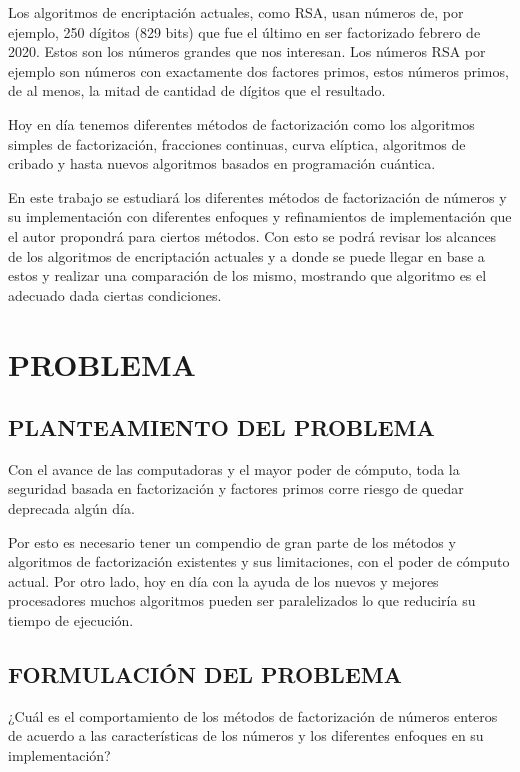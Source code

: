 \documentclass[12pt,letterpaper]{book}
\begin{document}
    Los algoritmos de encriptación actuales, como RSA, usan números de, por ejemplo, 250 dígitos (829 bits) que fue el último en ser factorizado febrero de 2020. Estos son los números grandes que nos interesan. Los números RSA por ejemplo son números con exactamente dos factores primos, estos números primos, de al menos, la mitad de cantidad de dígitos que el resultado.

    Hoy en día tenemos diferentes métodos de factorización como los algoritmos simples de factorización, fracciones continuas, curva elíptica, algoritmos de cribado y hasta nuevos algoritmos basados en programación cuántica.

    En este trabajo se estudiará los diferentes métodos de factorización de números y su implementación con diferentes enfoques y refinamientos de implementación que el autor propondrá para ciertos métodos. Con esto se podrá revisar los alcances de los algoritmos de encriptación actuales y a donde se puede llegar en base a estos y realizar una comparación de los mismo, mostrando que algoritmo es el adecuado dada ciertas condiciones.
    \newpage
    \chapter{PROBLEMA}
    
    \section{PLANTEAMIENTO DEL PROBLEMA}
    Con el avance de las computadoras y el mayor poder de cómputo, toda la seguridad basada en factorización y factores primos corre riesgo de quedar deprecada algún día.

    Por esto es necesario tener un compendio de gran parte de los métodos y algoritmos de factorización existentes y sus limitaciones, con el poder de cómputo actual. Por otro lado, hoy en día con la ayuda de los nuevos y mejores procesadores muchos algoritmos pueden ser paralelizados lo que reduciría su tiempo de ejecución.

    \section{FORMULACIÓN DEL PROBLEMA}
    ¿Cuál es el comportamiento de los métodos de factorización de números enteros de acuerdo a las características de los números y los diferentes enfoques en su implementación?
    
\end{document}
